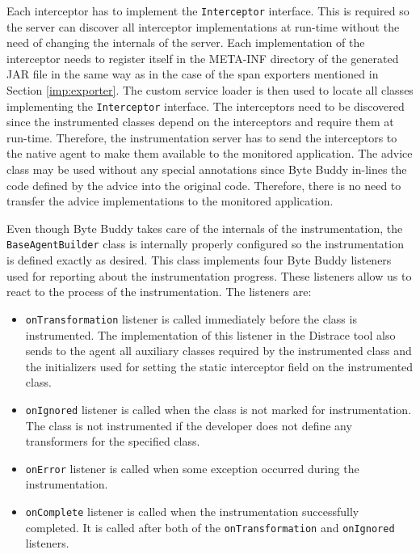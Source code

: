 Each interceptor has to implement the \texttt{Interceptor} interface. This is required so the server can discover all interceptor implementations at run-time without the need of changing the internals of the server. Each implementation of the interceptor needs to register itself in the META-INF directory of the generated JAR file in the same way as in the case of the span exporters mentioned in Section \ref{imp:exporter}. The custom service loader is then used to locate all classes implementing the \texttt{Interceptor} interface. The interceptors need to be discovered since the instrumented classes depend on the interceptors and require them at run-time. Therefore, the instrumentation server has to send the interceptors to the native agent to make them available to the monitored application. The advice class may be used without any special annotations since Byte Buddy in-lines the code defined by the advice into the original code. Therefore, there is no need to transfer the advice implementations to the monitored application.

Even though Byte Buddy takes care of the internals of the instrumentation, the \texttt{BaseAgentBuilder} class is internally properly configured so the instrumentation is defined exactly as desired. This class implements four Byte Buddy listeners used for reporting about the instrumentation progress. These listeners allow us to react to the process of the instrumentation. The listeners are:
\begin{itemize}
	\item \texttt{onTransformation} listener is called immediately before the class is instrumented. The implementation of this listener in the Distrace tool also sends to the agent all auxiliary classes required by the instrumented class and the initializers used for setting the static interceptor field on the instrumented class.
	\item \texttt{onIgnored} listener is called when the class is not marked for instrumentation. The class is not instrumented if the developer does not define any transformers for the specified class.
	\item \texttt{onError} listener is called when some exception occurred during the instrumentation.
	\item \texttt{onComplete} listener is called when the instrumentation successfully completed. It is called after both of the \texttt{onTransformation} and \texttt{onIgnored} listeners.
\end{itemize}

